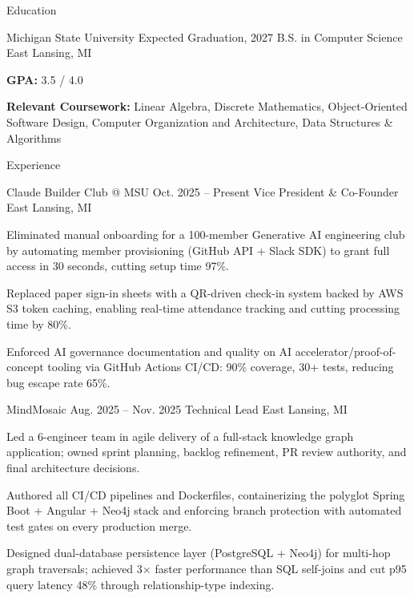 \documentclass[
	11pt
]{../../../resume}
\begin{document}
	\begin{rSection}{E}{ducation}
		\begin{rSectionEntry}
			{Michigan State University}
			{Expected Graduation, 2027}
			{B.S. in Computer Science}
			{}
			{East Lansing, MI}

			\item \textbf{GPA:} 3.5 / 4.0
			\item \textbf{Relevant Coursework:} Linear Algebra, Discrete Mathematics, Object-Oriented Software Design, Computer Organization and Architecture, Data Structures \& Algorithms
		\end{rSectionEntry}
	\end{rSection}

	\begin{rSection}{E}{xperience}
		\begin{rSectionEntry}
			{Claude Builder Club @ MSU}
			{Oct. 2025 -- Present}
			{Vice President \& Co-Founder}
			{}
			{East Lansing, MI}

			\item Eliminated manual onboarding for a 100-member Generative AI engineering club by automating member provisioning (GitHub API + Slack SDK) to grant full access in 30 seconds, cutting setup time 97\%.
			\item Replaced paper sign-in sheets with a QR-driven check-in system backed by AWS S3 token caching, enabling real-time attendance tracking and cutting processing time by 80\%.
			\item Enforced AI governance documentation and quality on AI accelerator/proof-of-concept tooling via GitHub Actions CI/CD: 90\% coverage, 30+ tests, reducing bug escape rate 65\%.
		\end{rSectionEntry}

		\begin{rSectionEntry}
			{MindMosaic}
			{Aug. 2025 -- Nov. 2025}
			{Technical Lead}
			{}
			{East Lansing, MI}

			\item Led a 6-engineer team in agile delivery of a full-stack knowledge graph application; owned sprint planning, backlog refinement, PR review authority, and final architecture decisions.
			\item Authored all CI/CD pipelines and Dockerfiles, containerizing the polyglot Spring Boot + Angular + Neo4j stack and enforcing branch protection with automated test gates on every production merge.
			\item Designed dual-database persistence layer (PostgreSQL + Neo4j) for multi-hop graph traversals; achieved 3$\times$ faster performance than SQL self-joins and cut p95 query latency 48\% through relationship-type indexing.
		\end{rSectionEntry}
	\end{rSection}
\end{document}
